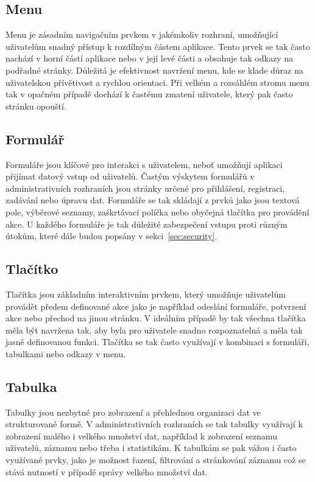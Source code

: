 \subsection*{Menu}
\label{subsec:admin-tags-menu}
Menu je zásadním navigačním prvkem v jakémkoliv rozhraní, umožňující uživatelům snadný přístup k rozdílným částem aplikace. Tento prvek se tak často nachází v horní částí aplikace nebo v její levé části a obsahuje tak odkazy na podřadné stránky. Důležitá je efektivnost navržení menu, kde se klade důraz na uživatelskou přívětivost a rychlou orientaci. Při velkém a rozsáhlém stromu menu tak v opačném případě dochází k častému zmatení uživatele, který pak často stránku opouští.

\subsection*{Formulář}
\label{subsec:admin-tags-form}
Formuláře jsou klíčové pro interakci s uživatelem, neboť umožňují aplikaci přijímat datový vstup od uživatelů. Častým výskytem formulářů v administrativních rozhraních jsou stránky určené pro přihlášení, registraci, zadávání nebo úpravu dat. Formuláře se tak skládají z prvků jako jsou textová pole, výběrové seznamy, zaškrtávací políčka nebo obyčejná tlačítka pro provádění akce. U každého formuláře je tak důležité zabezpečení vstupu proti různým útokům, které dále budou popsány v sekci~\ref{sec:security}.

\subsection*{Tlačítko}
\label{subsec:admin-tags-button}
Tlačítka jsou základním interaktivním prvkem, který umožňuje uživatelům provádět předem definované akce jako je například odeslání formuláře, potvrzení akce nebo přechod na jinou stránku. V ideálním případě by tak všechna tlačítka měla být navržena tak, aby byla pro uživatele snadno rozpoznatelná a měla tak jasně definovanou funkci. Tlačítka se tak často využívají v kombinaci s formuláři, tabulkami nebo odkazy v menu.

\subsection*{Tabulka}
\label{subsec:admin-tags-table}
Tabulky jsou nezbytné pro zobrazení a přehlednou organizaci dat ve strukturované formě. V administrativních rozhraních se tak tabulky využívají k zobrazení malého i velkého množství dat, například k zobrazení seznamu uživatelů, záznamu nebo třeba i statistikám. K tabulkám se pak vážou i často využívané prvky, jako je možnost řazení, filtrování a stránkování záznamu což se stává nutností v případě správy velkého množství dat.

